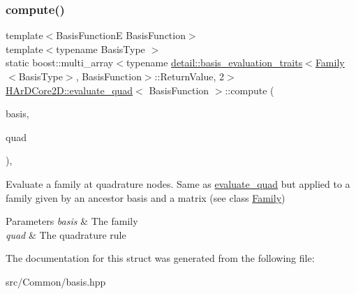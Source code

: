 \subsubsection{\texorpdfstring{compute()}{compute()}\hspace{0.1cm}{\footnotesize\ttfamily [2/2]}}
{\footnotesize\ttfamily template$<$Basis\+FunctionE Basis\+Function$>$ \\
template$<$typename Basis\+Type $>$ \\
static boost\+::multi\+\_\+array$<$typename \hyperlink{structHArDCore2D_1_1detail_1_1basis__evaluation__traits}{detail\+::basis\+\_\+evaluation\+\_\+traits}$<$\hyperlink{classHArDCore2D_1_1Family}{Family}$<$Basis\+Type$>$, Basis\+Function$>$\+::Return\+Value, 2$>$ \hyperlink{structHArDCore2D_1_1evaluate__quad}{H\+Ar\+D\+Core2\+D\+::evaluate\+\_\+quad}$<$ Basis\+Function $>$\+::compute (\begin{DoxyParamCaption}\item[{const \hyperlink{classHArDCore2D_1_1Family}{Family}$<$ Basis\+Type $>$ \&}]{basis,  }\item[{const Quadrature\+Rule \&}]{quad }\end{DoxyParamCaption})\hspace{0.3cm}{\ttfamily [inline]}, {\ttfamily [static]}}

Evaluate a family at quadrature nodes. Same as \textquotesingle{}\hyperlink{structHArDCore2D_1_1evaluate__quad}{evaluate\+\_\+quad}\textquotesingle{} but applied to a family given by an ancestor basis and a matrix (see class \textquotesingle{}\hyperlink{classHArDCore2D_1_1Family}{Family}\textquotesingle{}) 
\begin{DoxyParams}{Parameters}
{\em basis} & The family \\
\hline
{\em quad} & The quadrature rule \\
\hline
\end{DoxyParams}


The documentation for this struct was generated from the following file\+:\begin{DoxyCompactItemize}
\item 
src/\+Common/basis.\+hpp\end{DoxyCompactItemize}

